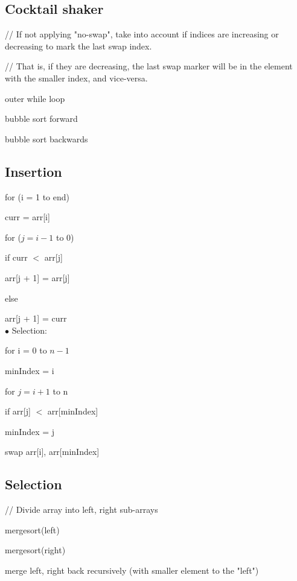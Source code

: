 \documentclass[english,openany]{book}
\begin{document}
    \subsection{Cocktail shaker}

    // If not applying "no-swap", take into account if indices are increasing or decreasing to mark the last swap index.

    // That is, if they are decreasing, the last swap marker will be in the element with the smaller index, and vice-versa.

    outer while loop

    \qquad bubble sort forward

    \qquad bubble sort backwards


    \subsection{Insertion}

    for (i = 1 to end)

    \qquad curr = arr[i]

    \qquad for ($j = i - 1$ to 0)

    \qquad \qquad if curr $<$ arr[j]

    \qquad \qquad \qquad arr[j + 1] = arr[j]

    \qquad \qquad else

    \qquad \qquad \qquad arr[j + 1] = curr\\

    $\bullet$ Selection:

    for i = 0 to $n - 1$

    \qquad minIndex = i

    \qquad for $j = i + 1$ to n

    \qquad \qquad if arr[j] $<$ arr[minIndex]

    \qquad \qquad \qquad minIndex = j

    \qquad \qquad swap arr[i], arr[minIndex]\\

    \subsection{Selection}

    // Divide array into left, right sub-arrays

    mergesort(left)

    mergesort(right)

    merge left, right back recursively (with smaller element to the "left")
\end{document}
